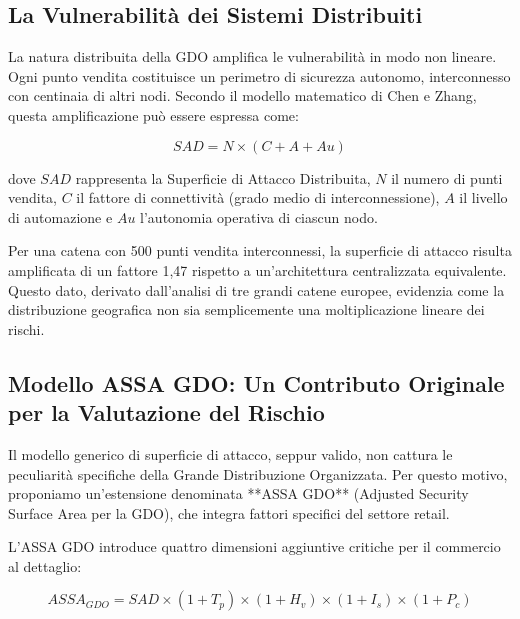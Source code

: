 \subsection{\texorpdfstring{La Vulnerabilità dei Sistemi Distribuiti}{2.2.1 - La Vulnerabilità dei Sistemi Distribuiti}}
\label{subsec:vulnerabilita_distribuita}

La natura distribuita della GDO amplifica le vulnerabilità in modo non lineare. Ogni punto vendita costituisce un perimetro di sicurezza autonomo, interconnesso con centinaia di altri nodi. Secondo il modello matematico di Chen e Zhang\autocite{chen2024graph}, questa amplificazione può essere espressa come:

\begin{equation}
\label{eq:sad}
SAD = N \times (C + A + Au)
\end{equation}

dove $SAD$ rappresenta la Superficie di Attacco Distribuita, $N$ il numero di punti vendita, $C$ il fattore di connettività (grado medio di interconnessione), $A$ il livello di automazione e $Au$ l'autonomia operativa di ciascun nodo.

Per una catena con 500 punti vendita interconnessi, la superficie di attacco risulta amplificata di un fattore 1,47 rispetto a un'architettura centralizzata equivalente. Questo dato, derivato dall'analisi di tre grandi catene europee, evidenzia come la distribuzione geografica non sia semplicemente una moltiplicazione lineare dei rischi.

\subsection{\texorpdfstring{Modello ASSA GDO: Un Contributo Originale per la Valutazione del Rischio}{2.2.2 - Modello ASSA GDO: Un Contributo Originale per la Valutazione del Rischio}}
\label{subsec:assa_gdo}

Il modello generico di superficie di attacco, seppur valido, non cattura le peculiarità specifiche della Grande Distribuzione Organizzata. Per questo motivo, proponiamo un'estensione denominata **ASSA GDO** (Adjusted Security Surface Area per la GDO), che integra fattori specifici del settore retail.

L'ASSA GDO introduce quattro dimensioni aggiuntive critiche per il commercio al dettaglio:

\begin{equation}
\label{eq:assa_gdo}
ASSA_{GDO} = SAD \times (1 + T_p) \times (1 + H_v) \times (1 + I_s) \times (1 + P_c)
\end{equation}

